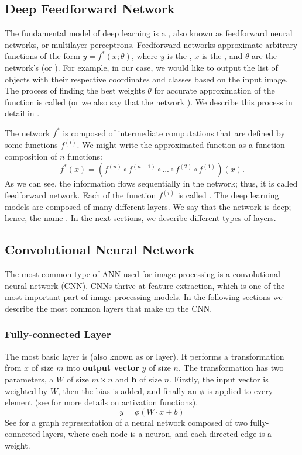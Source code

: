 \subsection{Deep Feedforward Network}
The fundamental model of deep learning is a , also
known as feedforward neural networks, or multilayer perceptrons. Feedforward
networks approximate arbitrary functions of the form $y = f^*(x;\theta)$, where
$y$ is the , $x$ is the , and $\theta$ are the network's
 (or ). For example, in our case, we would like to
output the list of objects with their respective coordinates and classes based
on the input image. The process of finding the best weights $\theta$ for
accurate approximation of the function is called  (or we also say
that the network ). We describe this process in detail in
.

The network $f^*$ is composed of intermediate computations that are defined by
some functions $f^{(i)}$. We might write the approximated function as a function
composition of $n$ functions:
$$
    f^*(x) = (f^{(n)} \circ f^{(n-1)} \circ ... \circ f^{(2)} \circ f^{(1)})(x).
$$
As we can see, the information flows sequentially in the network; thus, it is
called feedforward network. Each of the function $f^{(i)}$ is called .
The deep learning models are composed of many different layers. We say that the
network is deep; hence, the name . In the next sections, we
describe different types of layers.

\subsection{Convolutional Neural Network}
The most common type of ANN used for image processing is a convolutional neural
network (CNN). CNNs thrive at feature extraction, which is one of the most
important part of image processing models. In the following sections we describe
the most common layers that make up the CNN.

\subsubsection{Fully-connected Layer}
The most basic layer is  (also known as
 or  layer). It performs a transformation from
 $x$ of size $m$ into \textbf{output vector}
$y$ of size $n$. The transformation has two parameters, a
 $W$ of size $m \times n$ and 
$\boldsymbol{b}$ of size $n$. Firstly, the input vector is weighted by $W$, then
the bias is added, and finally an  $\phi$
is applied to every element (see  for more details on
activation functions).
$$
    y = \phi(W\cdot x + b)
$$
See  for a graph representation of a neural network composed
of two fully-connected layers, where each node is a neuron, and each directed
edge is a weight.

